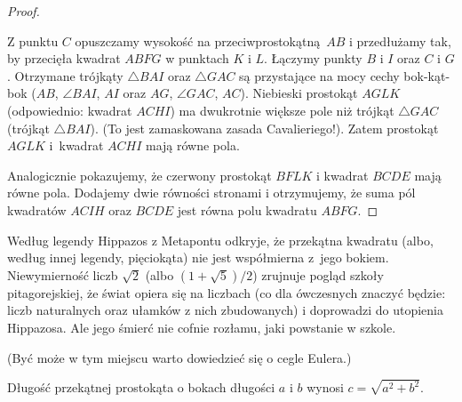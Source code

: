 \begin{proof}
\begin{center}
\begin{comment}
        \tkzDefSquare(C,B)
        \tkzGetPoints{E}{D}
        \tkzDrawPolygon[line width=0.3mm,fill=red!40](C,B,E,D)
        \tkzLabelPoint[above](D){$D$}
        \tkzLabelPoint[below](E){$E$}
        \tkzDefSquare(A,C)
        \tkzGetPoints{H}{I}
        \tkzDrawPolygon[line width=0.3mm, fill=blue!40](A,C,H,I)
        \tkzLabelPoint[above right](H){$H$}
        \tkzLabelPoint[above right](I){$I$}
        \tkzDrawSegments[line width=0.2mm](C,G)
        \tkzDrawSegments[line width=0.2mm, dashed](C,K)
        \tkzDrawSegments[line width=0.2mm](I,B)
        \tkzDrawPolygon[line width=0.5mm](A,B,C)
    \end{tikzpicture}
\end{comment}
    \end{center}
    Z punktu $C$ opuszczamy wysokość na przeciwprostokątną $AB$ i przedłużamy tak, by przecięła kwadrat $ABFG$ w punktach $K$ i $L$.
    Łączymy punkty $B$ i $I$ oraz $C$ i $G$.
    Otrzymane trójkąty $\triangle BAI$ oraz $\triangle GAC$ są przystające na mocy cechy bok-kąt-bok ($AB$, $\angle BAI$, $AI$ oraz $AG$, $\angle GAC$, $AC$).
    Niebieski prostokąt $AGLK$ (odpowiednio: kwadrat $ACHI$) ma dwukrotnie większe pole niż trójkąt $\triangle GAC$ (trójkąt $\triangle BAI$).
    (To jest zamaskowana zasada Cavalieriego!).
    Zatem prostokąt $AGLK$ i~kwadrat $ACHI$ mają równe pola.
    
    Analogicznie pokazujemy, że czerwony prostokąt $BFLK$ i kwadrat $BCDE$ mają równe pola.
    Dodajemy dwie równości stronami i otrzymujemy, że suma pól kwadratów $ACIH$ oraz $BCDE$ jest równa polu kwadratu $ABFG$.
\end{proof}

Według legendy Hippazos z Metapontu odkryje, że przekątna kwadratu (albo, według innej legendy, pięciokąta) nie jest współmierna z~jego bokiem.
Niewymierność liczb $\sqrt{2}$ (albo $(1 + \sqrt 5) /2$) zrujnuje pogląd szkoły pitagorejskiej, że świat opiera się na liczbach (co dla ówczesnych znaczyć będzie: liczb naturalnych oraz ułamków z nich zbudowanych) i doprowadzi do utopienia Hippazosa.
%
%
Ale jego śmierć nie cofnie rozłamu, jaki powstanie w szkole.

(Być może w tym miejscu warto dowiedzieć się o cegle Eulera.)

\begin{corollary}
    Długość przekątnej prostokąta o bokach długości $a$ i $b$ wynosi $c = \sqrt{a^2 + b^2}$.
\end{corollary}

